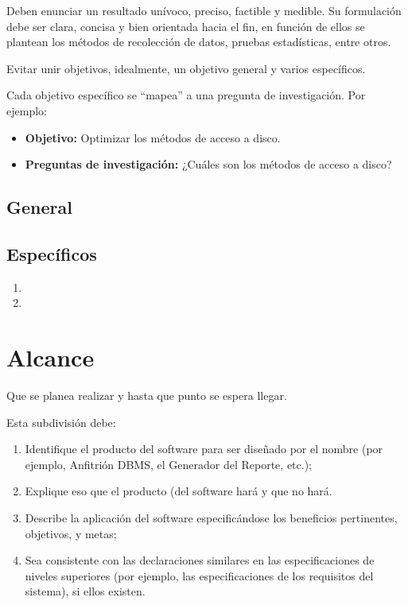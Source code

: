 \documentclass[letter,12pt]{report}
\newcommand\naranjo[1]{\textcolor[rgb]{1.00,0.36,0.06}{\textbf{#1}}}
\begin{document}
Deben enunciar un resultado unívoco, preciso, factible y medible. Su formulación debe ser clara, concisa y bien orientada hacia el fin, en función de ellos se plantean los métodos de recolección de datos, pruebas estadísticas, entre otros.

Evitar unir objetivos, idealmente, un objetivo general y varios específicos.

Cada objetivo específico se ``mapea'' a una pregunta de investigación.
Por ejemplo:
  \begin{itemize}
  \item \textbf{\naranjo{Objetivo:}} Optimizar los métodos de acceso a disco.
  \item \textbf{\naranjo{Preguntas de investigación:}} ¿Cuáles son los métodos de acceso a disco?
\end{itemize}
\subsection{General}
\blindtext %

\subsection{Específicos}
\begin{enumerate}\justifying
  \item \blindtext %
 
  \item \blindtext %

\end{enumerate}

\section{Alcance}
Que se planea realizar y hasta que punto se espera llegar.

Esta subdivisión debe:
\begin{enumerate}\justifying
  \item Identifique el producto del software para ser diseñado por el nombre (por ejemplo, Anfitrión DBMS, el Generador del Reporte, etc.);
  \item Explique eso que el producto (del software hará y que no hará.
  \item Describe la aplicación del software especificándose los beneficios pertinentes, objetivos, y metas;
  \item Sea consistente con las declaraciones similares en las especificaciones de niveles superiores (por ejemplo, las especificaciones de los requisitos del sistema), si ellos existen.
\end{enumerate}
\end{document}
